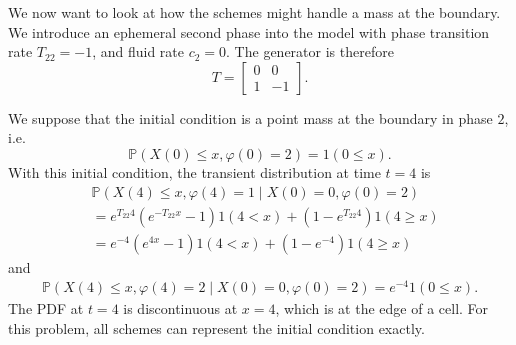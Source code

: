 \begin{example}\label{ex: wave 1}
	We now want to look at how the schemes might handle a mass at the boundary. We introduce an ephemeral second phase into the model with phase transition rate \(T_{22}=-1\), and fluid rate \(c_2=0\). The generator is therefore 
	\[T=\left[\begin{array}{cc} 0 & 0 \\ 1 & -1 \end{array}\right].\]

	We suppose that the initial condition is a point mass at the boundary in phase \(2\), i.e. \[\mathbb P(X(0)\leq x, \varphi(0)=2)=1(0\leq x).\] 
	With this initial condition, the transient distribution at time \(t=4\) is 
	\begin{align}
		&\mathbb P(X(4)\leq x,\varphi(4)=1 \mid X(0)=0,\varphi(0)=2) \nonumber 
		\\&= e^{T_{22}4}\left(e^{-T_{22}x}-1\right)1(4< x) + (1-e^{T_{22}4})1(4\geq x) \nonumber
		\\&= e^{-4}\left(e^{4x}-1\right)1(4< x) + (1-e^{-4})1(4\geq x) \label{eqn: asjda}
	\end{align}
	and 
	\begin{align}
		\mathbb P(X(4)\leq x,\varphi(4)=2 \mid X(0)=0,\varphi(0)=2) = e^{-4}1(0\leq x).
	\end{align}
	The PDF at \(t=4\) is discontinuous at \(x=4\), which is at the edge of a cell. For this problem, all schemes can represent the initial condition exactly.


\end{example}
